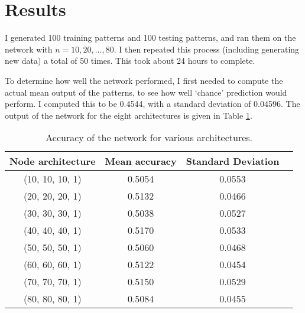 \documentclass[12pt]{article}
\begin{document}
\section{Results}
I generated 100 training patterns and 100 testing patterns, and ran them on the network with $n=10, 20, \ldots, 80$.  I then repeated this process (including generating new data) a total of 50 times. This took about 24 hours to complete.

To determine how well the network performed, I first needed to compute the actual mean output of the patterns, to see how well `chance' prediction would perform.  I computed this to be 0.4544, with a standard deviation of 0.04596.  The output of the network for the eight architectures is given in Table \ref{Accuracy-Table}.
\begin{table}[h]
    \begin{center}
    \begin{tabular}{|c|c|c|c|}
        \hline
        Node architecture & Mean accuracy & Standard Deviation \\
        \hline
        (10, 10, 10, 1) & 0.5054 &  0.0553\\
        \hline
        (20, 20, 20, 1) & 0.5132 &  0.0466\\
        \hline
        (30, 30, 30, 1) & 0.5038 &  0.0527\\
        \hline
        (40, 40, 40, 1) & 0.5170 & 0.0533\\
        \hline
        (50, 50, 50, 1) & 0.5060 & 0.0468\\
        \hline
        (60, 60, 60, 1) & 0.5122 &  0.0454\\
        \hline
        (70, 70, 70, 1) & 0.5150 & 0.0529\\
        \hline
        (80, 80, 80, 1) & 0.5084 &  0.0455\\
        \hline
    \end{tabular}
    \end{center}
    \caption{Accuracy of the network for various architectures.}
    \label{Accuracy-Table}
\end{table}
\end{document}
